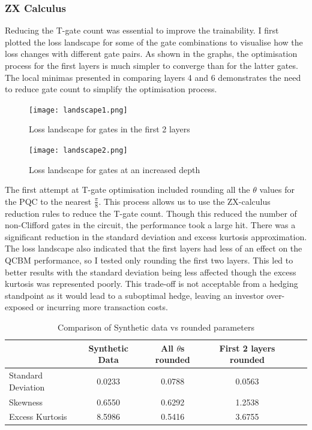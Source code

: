 \documentclass[12pt]{article}
\numberwithin{equation}{section}
\begin{document}
\subsubsection{ZX Calculus}
Reducing the T-gate count was essential to improve the trainability. 
I first plotted the loss landscape for some of the gate combinations to visualise 
how the loss changes with different gate pairs. As shown in the graphs, the 
optimisation process for the first layers is much simpler to converge than for 
the latter gates. The local minimas presented in comparing layers 4 and 6 
demonstrates the need to reduce gate count to simplify the optimisation process. 
\begin{figure}[h!]
    \centering
    \begin{minipage}{0.48\textwidth}
        \centering
        \texttt{[image: landscape1.png]}
        \caption{Loss landscape for gates in the first 2 layers}
        \label{fig:landscape1}
    \end{minipage}
    \hfill
    \begin{minipage}{0.48\textwidth}
        \centering
        \texttt{[image: landscape2.png]}
        \caption{Loss landscape for gates at an increased depth}
        \label{fig:landscape2}
    \end{minipage}
\end{figure}
The first attempt at T-gate optimisation included rounding all the $\theta$ values 
for the PQC to the nearest $\frac{\pi}{8}$. This process allows us to use the 
ZX-calculus reduction rules to reduce the T-gate count. Though this reduced the 
number of non-Clifford gates in the circuit, the performance took a large hit. 
There was a significant reduction in the standard deviation and excess kurtosis
approximation. The loss landscape also indicated that the first layers had less of an 
effect on the QCBM performance, so I tested only rounding the first two layers. 
This led to better results with the standard deviation being less affected though the 
excess kurtosis was represented poorly. This trade-off is not acceptable from a 
hedging standpoint as it would lead to a suboptimal hedge, leaving an investor 
over-exposed or incurring more transaction costs.  
\begin{table}[h!]
\centering
\begin{tabular}{lccccc}
\hline
\textbf{} & \textbf{Synthetic Data} & \textbf{All $\theta$s rounded } & \textbf{First 2 layers rounded} \\
\hline 
Standard Deviation & 0.0233 &0.0788 & 0.0563   \\
Skewness            & 0.6550 &0.6292 & 1.2538  \\
Excess Kurtosis     & 8.5986 &0.5416 & 3.6755   \\
\hline
\end{tabular}
\caption{Comparison of Synthetic data vs rounded parameters}
\label{tab:roundedtopi}
\end{table}
\end{document}
